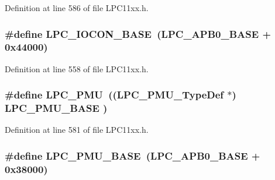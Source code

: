 Definition at line 586 of file L\+P\+C11xx.\+h.

\subsubsection[{\texorpdfstring{L\+P\+C\+\_\+\+I\+O\+C\+O\+N\+\_\+\+B\+A\+SE}{LPC_IOCON_BASE}}]{\setlength{\rightskip}{0pt plus 5cm}\#define L\+P\+C\+\_\+\+I\+O\+C\+O\+N\+\_\+\+B\+A\+SE~({\bf L\+P\+C\+\_\+\+A\+P\+B0\+\_\+\+B\+A\+SE} + 0x44000)}\hypertarget{group___l_p_c11xx___definitions_gae48aea115d5924805263d7a15402d4fa}{}\label{group___l_p_c11xx___definitions_gae48aea115d5924805263d7a15402d4fa}


Definition at line 558 of file L\+P\+C11xx.\+h.

\subsubsection[{\texorpdfstring{L\+P\+C\+\_\+\+P\+MU}{LPC_PMU}}]{\setlength{\rightskip}{0pt plus 5cm}\#define L\+P\+C\+\_\+\+P\+MU~(({\bf L\+P\+C\+\_\+\+P\+M\+U\+\_\+\+Type\+Def}    $\ast$) {\bf L\+P\+C\+\_\+\+P\+M\+U\+\_\+\+B\+A\+SE}   )}\hypertarget{group___l_p_c11xx___definitions_ga9d540cc313db00679c10f9ac1961b06a}{}\label{group___l_p_c11xx___definitions_ga9d540cc313db00679c10f9ac1961b06a}


Definition at line 581 of file L\+P\+C11xx.\+h.

\subsubsection[{\texorpdfstring{L\+P\+C\+\_\+\+P\+M\+U\+\_\+\+B\+A\+SE}{LPC_PMU_BASE}}]{\setlength{\rightskip}{0pt plus 5cm}\#define L\+P\+C\+\_\+\+P\+M\+U\+\_\+\+B\+A\+SE~({\bf L\+P\+C\+\_\+\+A\+P\+B0\+\_\+\+B\+A\+SE} + 0x38000)}\hypertarget{group___l_p_c11xx___definitions_ga865bed8ad61e9e273439ad1349a46d68}{}\label{group___l_p_c11xx___definitions_ga865bed8ad61e9e273439ad1349a46d68}


